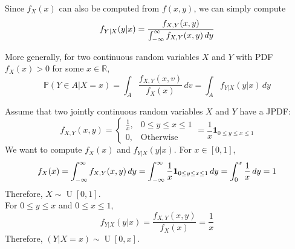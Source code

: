 \documentclass{huhtakm-template-book}
\newcommand{\prob}{\mathbb{P}}
\DeclareMathOperator{\U}{U}
\begin{document}
\newpage
\begin{rem}
	Since $f_{X}(x)$ can also be computed from $f(x,y)$, we can simply compute
	\begin{equation*}
		f_{Y|X}(y|x)=\frac{f_{X,Y}(x,y)}{\int_{-\infty}^{\infty} f_{X,Y}(x,y)\,dy}
	\end{equation*}
\end{rem}
\begin{rem}
	More generally, for two continuous random variables $X$ and $Y$ with PDF  $f_{X}(x)>0$ for some $x\in\mathbb{R}$,
	\begin{equation*}
		\prob(Y\in A|X=x)=\int_{A}\frac{f_{X,Y}(x,v)}{f_{X}(x)}\,dv=\int_{A}f_{Y|X}(y|x)\,dy
	\end{equation*}
\end{rem}
\begin{eg}
	\label{Chapter 5 (Example) JPDF to conditional PDF example}
	Assume that two jointly continuous random variables $X$ and $Y$ have a JPDF:
	\begin{equation*}
		f_{X,Y}(x,y)=\begin{cases}
			\frac{1}{x}, &0\leq y\leq x\leq 1\\
			0, &\text{Otherwise}
		\end{cases}=\frac{1}{x}\mathbf{1}_{0\leq y\leq x\leq 1}
	\end{equation*}
	We want to compute $f_{X}(x)$ and $f_{Y|X}(y|x)$.
	For $x\in [0,1]$,
	\begin{equation*}
		f_{X}(x)=\int_{-\infty}^{\infty} f_{X,Y}(x,y)\,dy=\int_{-\infty}^{\infty}\frac{1}{x}\mathbf{1}_{0\leq y\leq x\leq 1}\,dy=\int_{0}^{x}\frac{1}{x}\,dy=1
	\end{equation*}
	Therefore, $X\sim\U[0,1]$.\\
	For $0\leq y\leq x$ and $0\leq x\leq 1$,
	\begin{equation*}
		f_{Y|X}(y|x)=\frac{f_{X,Y}(x,y)}{f_{X}(x)}=\frac{1}{x}
	\end{equation*}
	Therefore, $(Y|X=x)\sim\U[0,x]$.
\end{eg}
\end{document}
